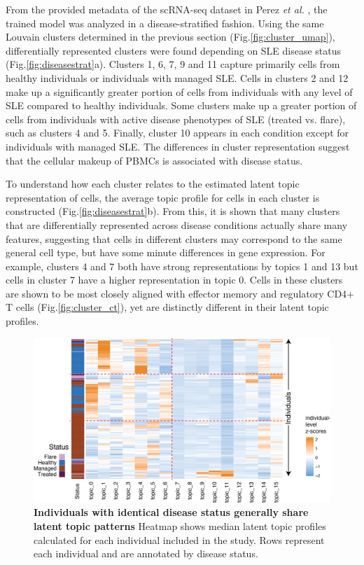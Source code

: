 From the provided metadata of the scRNA-seq dataset in Perez \textit{et al.} \cite{sledata}, the trained model was analyzed in a disease-stratified fashion. Using the same Louvain clusters determined in the previous section (Fig.\ref{fig:cluster_umap}), differentially represented clusters were found depending on SLE disease status (Fig.\ref{fig:diseasestrat}a). Clusters 1, 6, 7, 9 and 11 capture primarily cells from healthy individuals or individuals with managed SLE. Cells in clusters 2 and 12 make up a significantly greater portion of cells from individuals with any level of SLE compared to healthy individuals. Some clusters make up a greater portion of cells from individuals with active disease phenotypes of SLE (treated vs. flare), such as clusters 4 and 5. Finally, cluster 10 appears in each condition except for individuals with managed SLE. The differences in cluster representation suggest that the cellular makeup of PBMCs is associated with disease status. 

To understand how each cluster relates to the estimated latent topic representation of cells, the average topic profile for cells in each cluster is constructed (Fig.\ref{fig:diseasestrat}b). From this, it is shown that many clusters that are differentially represented across disease conditions actually share many features, suggesting that cells in different clusters may correspond to the same general cell type, but have some minute differences in gene expression. For example, clusters 4 and 7 both have strong representations by topics 1 and 13 but cells in cluster 7 have a higher representation in topic 0. Cells in these clusters are shown to be most closely aligned with effector memory and regulatory CD4+ T cells (Fig.\ref{fig:cluster_ct}), yet are distinctly different in their latent topic profiles. 

\begin{figure}
    \centering
    \includegraphics[width=\textwidth]{Figures/ind_median_latent_prof.png}
    \caption{\textbf{Individuals with identical disease status generally share latent topic patterns} Heatmap shows median latent topic profiles calculated for each individual included in the study. Rows represent each individual and are annotated by disease status.}
    \label{fig:ind_latent_prof}
\end{figure}

